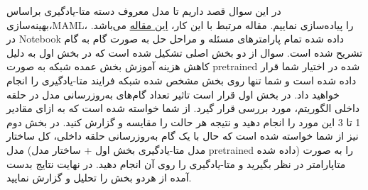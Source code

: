 \documentclass{article}
\begin{document}
در این سوال قصد داریم تا مدل معروف دسته متا-یادگیری براساس بهینه‌سازی،‌MAML،‌ را پیاده‌سازی نماییم. مقاله مرتبط با این کار،
\href{https://arxiv.org/pdf/1703.03400}{این مقاله}
می‌باشد. در Notebook داده شده تمام پارامترهای مسئله و مراحل حل به صورت گام به گام تشریح شده است.
سوال از دو بخش اصلی تشکیل شده است که در بخش اول به دلیل کاهش هزینه آموزش بخش عمده شبکه به صورت pretrained شده در اختیار شما قرار داده شده است و شما تنها روی بخش مشخص شده شبکه فرایند متا-یادگیری را انجام خواهید داد. در بخش اول قرار است تاثیر تعداد گام‌های به‌روزرسانی مدل در حلقه داخلی الگوریتم، مورد بررسی قرار گیرد. از شما خواسته شده است که به ازای مقادیر 1 تا 3 این مورد را انجام دهید و نتیجه هر حالت را مقایسه و گزارش کنید. در بخش دوم نیز از شما خواسته شده است که حال با یک گام به‌روزرسانی حلقه داخلی‌، کل ساختار مدل (مدل متا-یادگیری بخش اول + ساختار مدل pretrained داده شده) را به صورت متاپارامتر در نظر بگیرید و متا-یادگیری را روی آن انجام دهید. در نهایت نتایج بدست آمده از هردو بخش را تحلیل و گزارش نمایید.
\end{document}

